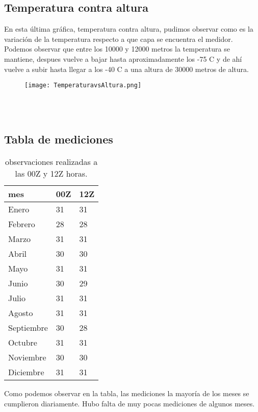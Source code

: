 \documentclass[12pt,letterpaper]{article}
\begin{document}
\begin{portada}
\subsection{Temperatura contra altura}
En esta última gráfica, temperatura contra altura, pudimos observar como es la variación de la temperatura respecto a que capa se encuentra el medidor. Podemos observar que entre los 10000 y 12000 metros la temperatura se mantiene, despues vuelve a bajar hasta aproximadamente los -75 C y de ahí vuelve a subir hasta llegar a los -40 C a una altura de 30000 metros de altura. 
\begin{figure}[htb]
\begin{center}
\texttt{[image: TemperaturavsAltura.png]}
\end{center}
\end{figure}
\\\\


\subsection{Tabla de mediciones}
\begin{table}[htbp]
\begin{center}
\begin{tabular}{|l|l|l|}
\hline \hline
mes & 00Z & 12Z  \\
\hline \hline
Enero & 31 & 31 \\ \hline
Febrero & 28 & 28\\ \hline
Marzo & 31 & 31\\ \hline
Abril & 30 & 30 \\ \hline
Mayo & 31 & 31 \\ \hline
Junio & 30 & 29 \\ \hline
Julio & 31 & 31 \\ \hline
Agosto & 31 & 31 \\ \hline
Septiembre & 30 & 28 \\ \hline
Octubre & 31 & 31 \\ \hline
Noviembre & 30 & 30 \\ \hline
Diciembre & 31 & 31\\ \hline
\end{tabular}
\caption{observaciones realizadas a las 00Z y 12Z horas.}
\label{tabla:sencilla}
\end{center}
\end{table}


Como podemos observar en la tabla, las mediciones la mayoría de los meses se cumplieron diariamente. Hubo falta de muy pocas mediciones de algunos meses.



\end{portada}
\end{document}
